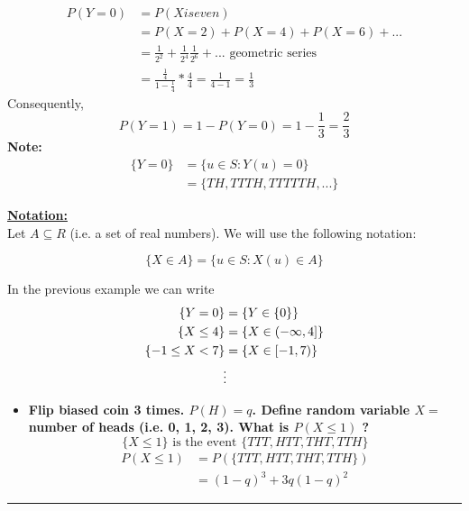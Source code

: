 \documentclass[10pt]{article}
\begin{document}
\begin{flushleft}
\begin{itemize}
$$\begin{aligned}
            P(Y = 0) &= P(X is even) \\
                     &= P(X = 2) + P(X = 4) + P(X = 6) + ... \\
                     &= \frac{1}{2^2} + \frac{1}{2^4} \frac{1}{2^6} + ...
                     \text{ geometric series} \\
                     &= \frac{\frac{1}{4}}{1 - \frac{1}{4}} * \frac{4}{4} =
                     \frac{1}{4 - 1} = \frac{1}{3}
        \end{aligned} $$
        Consequently,
        $$ P(Y = 1) = 1 - P(Y = 0) = 1 - \frac{1}{3} = \frac{2}{3} $$
        \textbf{Note:}
            $$ \begin{aligned}
                \{ Y = 0 \} &= \{ u \in S : Y(u) = 0 \}  \\
                            &= \{ TH, TTTH, TTTTTH, ... \}
            \end{aligned} $$
\end{itemize}

\textbf{\underline{Notation:}} \\
Let $A \subseteq R $ (i.e. a set of real numbers). We will use the following
notation:

$$ \boxed{
    \{ X \in A \} = \{ u \in S : X(u) \in A \}
}$$

In the previous example we can write
$$ \begin{aligned}
    \{ Y = 0 \} &= \{ Y \in \{0\}\} \\
    \{ X \leq 4 \} &= \{ X \in (-\infty, 4]\} \\
    \{ -1 \leq X < 7 \} &= \{ X \in [-1, 7)\} \\
    \vdotswithin{}
\end{aligned} $$

\begin{itemize}
    \item[\textbf{\underline{Example:}}] \textbf{Flip biased coin 3 times. $P(H)
        = q$. Define random variable $X =$ number of heads (i.e. 0, 1, 2, 3).
    What is $P(X \leq 1)$ ?}
    $$ \{ X \leq 1 \} \text{ is the event } \{ TTT, HTT, THT, TTH \} $$
    $$ \begin{aligned}
        P(X \leq 1) &= P( \{ TTT, HTT, THT, TTH \} ) \\
                    &= (1 - q)^3 + 3q(1 - q)^2
    \end{aligned} $$
\end{itemize}

\begin{center}
    \noindent\rule{6.5in}{0.4pt}
\end{center}


\end{flushleft}
\end{document}
